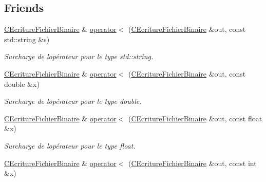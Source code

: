 \subsection*{Friends}
\begin{DoxyCompactItemize}
\item 
\hypertarget{class_c_ecriture_fichier_binaire_a2c88c30ff08c7d9035596e0187d44e45}{}\hyperlink{class_c_ecriture_fichier_binaire}{C\+Ecriture\+Fichier\+Binaire} \& \hyperlink{class_c_ecriture_fichier_binaire_a2c88c30ff08c7d9035596e0187d44e45}{operator$<$} (\hyperlink{class_c_ecriture_fichier_binaire}{C\+Ecriture\+Fichier\+Binaire} \&out, const std\+::string \&s)\label{class_c_ecriture_fichier_binaire_a2c88c30ff08c7d9035596e0187d44e45}

\begin{DoxyCompactList}\small\item\em Surcharge de l\textquotesingle{}opérateur pour le type {\itshape std\+::string}. \end{DoxyCompactList}\item 
\hypertarget{class_c_ecriture_fichier_binaire_afcaa555d19b37490df9fda731cf8cb19}{}\hyperlink{class_c_ecriture_fichier_binaire}{C\+Ecriture\+Fichier\+Binaire} \& \hyperlink{class_c_ecriture_fichier_binaire_afcaa555d19b37490df9fda731cf8cb19}{operator$<$} (\hyperlink{class_c_ecriture_fichier_binaire}{C\+Ecriture\+Fichier\+Binaire} \&out, const double \&x)\label{class_c_ecriture_fichier_binaire_afcaa555d19b37490df9fda731cf8cb19}

\begin{DoxyCompactList}\small\item\em Surcharge de l\textquotesingle{}opérateur pour le type {\itshape double}. \end{DoxyCompactList}\item 
\hypertarget{class_c_ecriture_fichier_binaire_a68e43a125ee6c25828485dfb7270fdea}{}\hyperlink{class_c_ecriture_fichier_binaire}{C\+Ecriture\+Fichier\+Binaire} \& \hyperlink{class_c_ecriture_fichier_binaire_a68e43a125ee6c25828485dfb7270fdea}{operator$<$} (\hyperlink{class_c_ecriture_fichier_binaire}{C\+Ecriture\+Fichier\+Binaire} \&out, const float \&x)\label{class_c_ecriture_fichier_binaire_a68e43a125ee6c25828485dfb7270fdea}

\begin{DoxyCompactList}\small\item\em Surcharge de l\textquotesingle{}opérateur pour le type {\itshape float}. \end{DoxyCompactList}\item 
\hypertarget{class_c_ecriture_fichier_binaire_a57ac55aefec2f3dd683cef75c409944b}{}\hyperlink{class_c_ecriture_fichier_binaire}{C\+Ecriture\+Fichier\+Binaire} \& \hyperlink{class_c_ecriture_fichier_binaire_a57ac55aefec2f3dd683cef75c409944b}{operator$<$} (\hyperlink{class_c_ecriture_fichier_binaire}{C\+Ecriture\+Fichier\+Binaire} \&out, const int \&x)\label{class_c_ecriture_fichier_binaire_a57ac55aefec2f3dd683cef75c409944b}


\end{DoxyCompactItemize}
